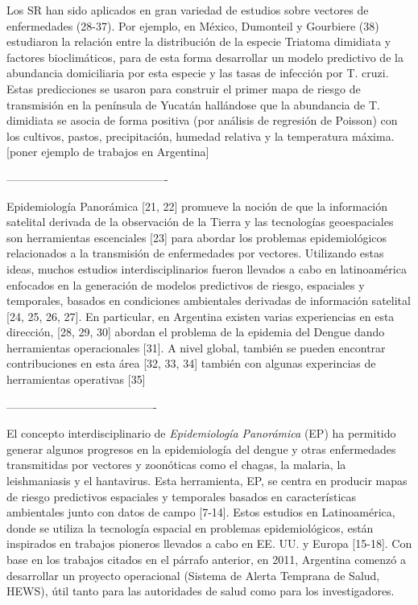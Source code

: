 Los SR han sido aplicados en gran variedad de estudios sobre vectores de
enfermedades (28-37). Por ejemplo, en México, Dumonteil y Gourbiere (38)
estudiaron la relación entre la distribución de la especie Triatoma dimidiata
y factores bioclimáticos, para de esta forma desarrollar un modelo predictivo de
la abundancia domiciliaria por esta especie y las tasas de infección
por T. cruzi. Estas predicciones se usaron para construir el primer mapa de
riesgo de transmisión en la península de Yucatán hallándose que la abundancia de T.
dimidiata se asocia de forma positiva (por análisis de regresión de Poisson)
con los cultivos, pastos, precipitación, humedad relativa y la temperatura
máxima. [poner ejemplo de trabajos en Argentina]

-------------------------------------------

Epidemiología Panorámica [21, 22] promueve la noción de que la información
satelital derivada de la observación de la Tierra y las tecnologías geoespaciales
son herramientas escenciales [23] para abordar los problemas epidemiológicos
relacionados a la transmisión de enfermedades por vectores. Utilizando
estas ideas, muchos estudios interdisciplinarios fueron llevados a cabo en
latinoamérica enfocados en la generación de modelos predictivos de riesgo,
espaciales y temporales, basados en condiciones ambientales derivadas de
información satelital [24, 25, 26, 27]. En particular, en Argentina
existen varias experiencias en esta dirección, [28, 29, 30] abordan el
problema de la epidemia del Dengue dando herramientas operacionales [31].
A nivel global, también se pueden encontrar contribuciones en esta área
[32, 33, 34] también con algunas experincias de herramientas operativas [35]


----------------------------------------

El concepto interdisciplinario de \textit{Epidemiología Panorámica} (EP)
ha permitido generar algunos progresos en la epidemiología del dengue y otras
enfermedades transmitidas por vectores y zoonóticas como el chagas, la
malaria, la leishmaniasis y el hantavirus. Esta herramienta, EP, se centra en
producir mapas de riesgo predictivos espaciales y temporales basados en
características ambientales junto con datos de campo [7-14].
Estos estudios en Latinoamérica, donde se utiliza la tecnología espacial en
problemas epidemiológicos, están inspirados en trabajos pioneros llevados a cabo
en EE. UU. y Europa [15-18].
Con base en los trabajos citados en el párrafo anterior, en 2011, Argentina
comenzó a desarrollar un proyecto operacional
(Sistema de Alerta Temprana de Salud, HEWS), útil tanto para las autoridades de
salud como para los investigadores.


